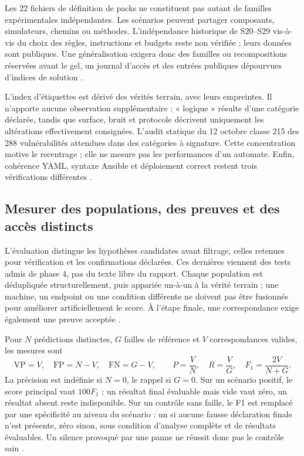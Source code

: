 \documentclass[11pt,a4paper]{article}
\begin{document}
Les 22 fichiers de définition de packs ne constituent pas autant de familles
expérimentales indépendantes. Les scénarios peuvent partager composants,
simulateurs, chemins ou méthodes. L'indépendance historique de S20--S29 vis-à-vis
du choix des règles, instructions et budgets reste non vérifiée ; leurs données
sont publiques. Une généralisation exigera donc des familles ou recompositions
réservées avant le gel, un journal d'accès et des entrées publiques dépourvues
d'indices de solution \cite{intro-protocol}.

L'index d'étiquettes est dérivé des vérités terrain, avec leurs empreintes.
Il n'apporte aucune observation supplémentaire : « logique » résulte d'une
catégorie déclarée, tandis que surface, bruit et protocole décrivent uniquement
les altérations effectivement consignées. L'audit statique du 12 octobre classe
215 des 288 vulnérabilités attendues dans des catégories à signature. Cette
concentration motive le recentrage ; elle ne mesure pas les performances
d'un automate. Enfin, cohérence YAML, syntaxe Ansible et déploiement correct
restent trois vérifications différentes \cite{bench-labels,bench-couverture}.

\subsection{Mesurer des populations, des preuves et des accès distincts}

L'évaluation distingue les hypothèses candidates avant filtrage, celles retenues
pour vérification et les confirmations déclarées. Ces dernières viennent des
tests admis de phase 4, pas du texte libre du rapport. Chaque population est
dédupliquée structurellement, puis appariée un-à-un à la vérité terrain ; une
machine, un endpoint ou une condition différente ne doivent pas être fusionnés
pour améliorer artificiellement le score. À l'étape finale, une correspondance
exige également une preuve acceptée \cite{sec-evaluation,bench-funnel}.

Pour \(N\) prédictions distinctes, \(G\) failles de référence et \(V\)
correspondances valides, les mesures sont
\[
  \mathrm{VP}=V,\quad \mathrm{FP}=N-V,\quad \mathrm{FN}=G-V,\qquad
  P=\frac{V}{N},\quad R=\frac{V}{G},\quad F_1=\frac{2V}{N+G}.
\]
La précision est indéfinie si \(N=0\), le rappel si \(G=0\).
Sur un scénario positif, le score principal vaut \(100F_1\) ; un résultat
final évaluable mais vide vaut zéro, un résultat absent reste indisponible.
Sur un contrôle sans faille, le F1 est remplacé par une spécificité au niveau
du scénario : un si aucune fausse déclaration finale n'est présente, zéro
sinon, sous condition d'analyse complète et de résultats évaluables.
Un silence provoqué par une panne ne réussit donc pas le contrôle sain
\cite{sec-evaluation}.
\end{document}
